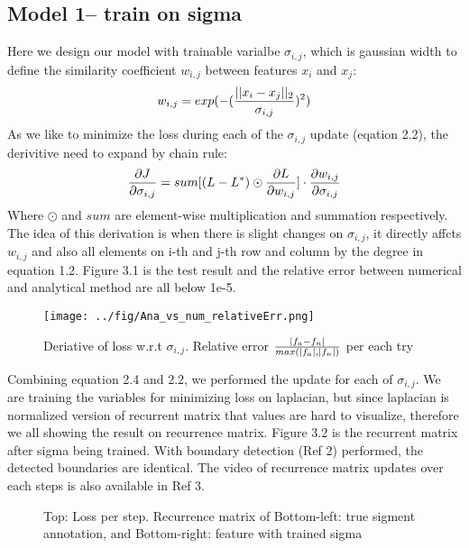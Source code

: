 \documentclass[final]{siamltexmm}
\begin{document}
\subsection{Model 1-- train on sigma}
Here we design our model with trainable varialbe $\sigma_{i,j}$, which is gaussian width to define the similarity coefficient $w_{i,j}$ between features $x_i$ and $x_j$:
\begin{equation}
w_{i,j} = exp(- ({|| x_i - x_j ||_2 \over \sigma_{i,j} })^2)
\end{equation}
As we like to minimize the loss during each of the $\sigma_{i,j}$ update (eqation 2.2), the derivitive need to expand by chain rule:
\begin{equation}
{\partial J \over \partial \sigma_{i,j}} = sum[(L - L^{\ast}) \odot {\partial L \over \partial w_{i,j}}] \cdot {\partial w_{i,j} \over \partial \sigma_{i,j}}
\end{equation}
Where $\odot$ and $sum$ are element-wise multiplication and summation respectively. The idea of this derivation is when there is slight changes on $\sigma_{i,j}$, it directly affcts $w_{i,j}$ and also all elements on i-th and j-th row and column by the degree in equation 1.2. Figure 3.1 is the test result and the relative error between numerical and analytical method are all below 1e-5.

\begin{figure}[H]
  \centering
    \texttt{[image: ../fig/Ana\_vs\_num\_relativeErr.png]}
  \caption{Deriative of loss w.r.t $\sigma_{i,j}$. Relative error $|f_a - f_n| \over max(|f_a|, |f_n|)$ per each try}
\end{figure}

Combining equation 2.4 and 2.2, we performed the update for each of $\sigma_{i,j}$. We are training the variables for minimizing loss on laplacian, but since laplacian is normalized version of recurrent matrix that values are hard to visualize, therefore we all showing the result on recurrence matrix. Figure 3.2 is the recurrent matrix after sigma being trained. With boundary detection (Ref 2) performed, the detected boundaries are identical. The video of recurrence matrix updates over each steps is also available in Ref 3.

\begin{figure}[H]
\centering
   \begin{subfigure}
   \texttt{[image: ../fig/UpdateTest\_num\_singleII\_Alpha100000\_err.png]}
\end{subfigure}

\begin{subfigure}
   \texttt{[image: ../fig/boundary\_sigma.png]}
\end{subfigure}
\caption{Top: Loss per step. Recurrence matrix of Bottom-left: true sigment annotation, and Bottom-right: feature with trained sigma }
\end{figure}
\end{document}
